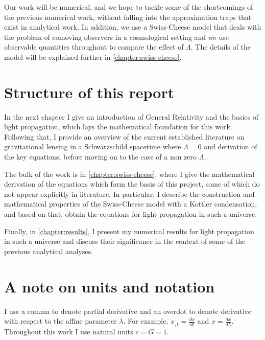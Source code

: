 Our work will be numerical, and we hope to tackle some of the shortcomings of the previous numerical work, without falling into the approximation traps that exist in analytical work. In addition, we use a Swiss-Cheese model that deals with the problem of comoving observers in a cosmological setting and we use observable quantities throughout to compare the effect of $\Lambda$. The details of the model will be explained further in \autoref{chapter:swiss-cheese}.

\section{Structure of this report}
In the next chapter I give an introduction of General Relativity and the basics of light propagation, which lays the mathematical foundation for this work. Following that, I provide an overview of the current established literature on gravitational lensing in a Schwarzschild spacetime where $\Lambda = 0$ and derivation of the key equations, before moving on to the case of a non zero $\Lambda$. 

The bulk of the work is in \autoref{chapter:swiss-cheese}, where I give the mathematical derivation of the equations which form the basis of this project, some of which do not appear explicitly in literature. In particular, I describe the construction and mathematical properties of the Swiss-Cheese model with a Kottler condensation, and based on that, obtain the equations for light propagation in such a universe. 

Finally, in \autoref{chapter:results}, I present my numerical results for light propagation in such a universe and discuss their significance in the context of some of the previous analytical analyses. 

\section{A note on units and notation}
I use a comma to denote partial derivative and an overdot to denote derivative with respect to the affine parameter $\lambda$. For example, $x_{,t} = \frac{\partial x}{\partial t}$ and $\dot{x} = \frac{dx}{d\lambda}$. Throughout this work I use natural units $c = G = 1$. 
